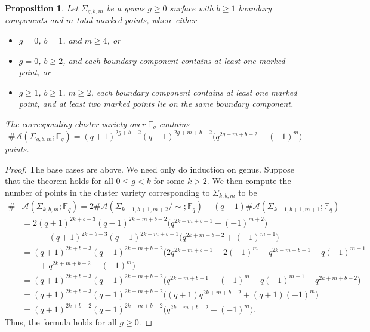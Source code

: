 \documentclass[reqno,12pt]{amsart}
\newtheorem{prop}[thm]{Proposition}
\theoremstyle{definition}
\theoremstyle{remark}
\theoremstyle{remark}
\numberwithin{equation}{section}
\begin{document}
\begin{prop}\label{prop:genus g points}
    Let $\Sigma_{g,b,m}$ be a genus $g\geq 0$ surface with $b\geq 1$ boundary components and $m$ total marked points, where either 
    \begin{itemize}
        \item $g =0$, $b = 1$, and $m\geq 4$, or
        \item $g=0$, $b \geq 2$, and each boundary component contains at least one marked point, or
        \item $g \geq 1$, $b \geq 1$, $m\geq 2$, each boundary component contains at least one marked point, and at least two marked points lie on the same boundary component.
    \end{itemize}
    The corresponding cluster variety over $\mathbb{F}_q$ contains \[ \#\mathcal{A}(\Sigma_{g,b,m}; \mathbb{F}_q) = (q+1)^{2g+b-2} (q-1)^{2g+m+b-2} \big(q^{2g+m+b-2} + (-1)^{m}\big) \] points.
\end{prop}
\begin{proof}
    The base cases are above. We need only do induction on genus. Suppose that the theorem holds for all $0 \leq g < k$ for some $k>2$. We then compute the number of points in the cluster variety corresponding to $\Sigma_{k,b,m}$ to be
    \begin{align*}
        \#&\mathcal{A}(\Sigma_{k,b,m}; \mathbb{F}_q) =  2\#\mathcal{A}(\Sigma_{k-1,b+1,m+2}/\!\sim; \mathbb{F}_q) - (q-1) \#\mathcal{A}(\Sigma_{k-1,b+1,m+1}; \mathbb{F}_q) \\
        &= 2(q+1)^{2k+b-3} (q-1)^{2k+m+b-2} \big(q^{2k+m+b-1} + (-1)^{m+2}\big) \\ &\quad\quad - (q+1)^{2k+b-3} (q-1)^{2k+m+b-1} \big(q^{2k+m+b-2} + (-1)^{m+1}\big) \\
        &= (q+1)^{2k+b-3} (q-1)^{2k+m+b-2} \big( 2q^{2k+m+b-1} + 2(-1)^{m} -q^{2k+m+b-1} -q(-1)^{m+1}  \\ &\quad\quad  + q^{2k+m+b-2} - (-1)^{m} \big) \\
        &= (q+1)^{2k+b-3} (q-1)^{2k+m+b-2} \big( q^{2k+m+b-1} + (-1)^{m} - q(-1)^{m+1} +q^{2k+m+b-2} \big) \\
        &= (q+1)^{2k+b-3} (q-1)^{2k+m+b-2} \big( (q+1)q^{2k+m+b-2} + (q+1)(-1)^{m} \big) \\
        &= (q+1)^{2k+b-2} (q-1)^{2k+m+b-2} \big( q^{2k+m+b-2} + (-1)^{m} \big).
    \end{align*}
    Thus, the formula holds for all $g\geq 0$. 
\end{proof}
\end{document}
